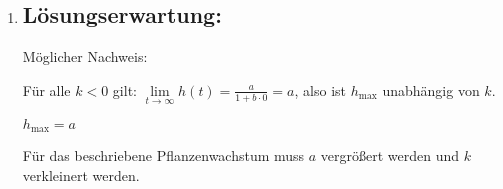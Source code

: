\begin{langesbeispiel}
{\begin{enumerate}
Mögliche Begründung:

Die Steigung von $h$ ist anfangs kleiner als jene von $h_1$, dann größer und dann wieder kleiner. Es gibt daher mindestens zwei Zeitpunkte, in denen sie gleich ist.

\item \subsection{Lösungserwartung:}

Möglicher Nachweis:

Für alle $k<0$ gilt: $\lim\limits_{t \rightarrow \infty}{h(t)=\frac{a}{1+b\cdot 0}=a}$, also ist $h_{\text{max}}$ unabhängig von $k$.

$h_{\text{max}}=a$\leer

Für das beschriebene Pflanzenwachstum muss $a$ vergrößert werden und $k$ verkleinert werden.
\end{enumerate}}
	
	\end{langesbeispiel}
